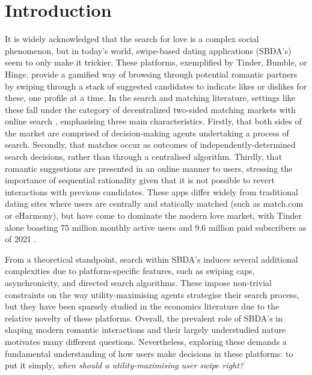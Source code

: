 \section{Introduction}
\label{sec:section1}
It is widely acknowledged that the search for love is a complex social phenomenon, but in today's world, swipe-based dating applications (SBDA's) seem to only make it trickier.
These platforms, exemplified by Tinder, Bumble, or Hinge, provide a gamified way of browsing through potential romantic partners by swiping through a stack of suggested candidates to indicate likes or dislikes for these, one profile at a time. 
In the search and matching literature, settings like these fall under the category of decentralized two-sided matching markets with online search \citep{kanoria2021facilitating}, emphasising three main characteristics.
Firstly, that both sides of the market are comprised of decision-making agents undertaking a process of search.
Secondly, that matches occur as outcomes of independently-determined search decisions, rather than through a centralised algorithm. Thirdly, that romantic suggestions are presented in an online manner to users, stressing the importance of sequential rationality given that it is not possible to revert interactions with previous candidates.
These apps differ widely from traditional dating sites where users are centrally and statically matched (such as match.com or eHarmony), but have come to dominate the modern love market, with Tinder alone boasting 75 million monthly active users and 9.6 million paid subscribers as of 2021 \citep{web:tinder_stats}.

From a theoretical standpoint, search within SBDA's induces several additional complexities due to platform-specific features, such as swiping caps, asynchronicity, and directed search algorithms.
These impose non-trivial constraints on the way utility-maximising agents strategise their search process, but they have been sparsely studied in the economics literature due to the relative novelty of these platforms.
Overall, the prevalent role of SBDA's in shaping modern romantic interactions and their largely understudied nature motivates many different questions.
Nevertheless, exploring these demands a fundamental understanding of how users make decisions in these platforms: to put it simply, \textit{when should a utility-maximising user swipe right?}

